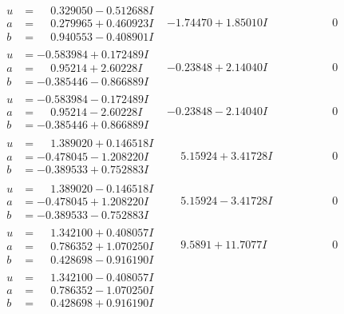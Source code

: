 \documentclass[1p]{elsarticle_modified}
\theoremstyle{definition}
\begin{document}
$$\begin{array}{c|c|c}
\begin{aligned}
u &= \phantom{-}0.329050 - 0.512688 I \\
a &= \phantom{-}0.279965 + 0.460923 I \\
b &= \phantom{-}0.940553 - 0.408901 I\end{aligned}
 & -1.74470 + 1.85010 I & \phantom{-0.000000 } 0 \\ \hline\begin{aligned}
u &= -0.583984 + 0.172489 I \\
a &= \phantom{-}0.95214 + 2.60228 I \\
b &= -0.385446 - 0.866889 I\end{aligned}
 & -0.23848 + 2.14040 I & \phantom{-0.000000 } 0 \\ \hline\begin{aligned}
u &= -0.583984 - 0.172489 I \\
a &= \phantom{-}0.95214 - 2.60228 I \\
b &= -0.385446 + 0.866889 I\end{aligned}
 & -0.23848 - 2.14040 I & \phantom{-0.000000 } 0 \\ \hline\begin{aligned}
u &= \phantom{-}1.389020 + 0.146518 I \\
a &= -0.478045 - 1.208220 I \\
b &= -0.389533 + 0.752883 I\end{aligned}
 & \phantom{-}5.15924 + 3.41728 I & \phantom{-0.000000 } 0 \\ \hline\begin{aligned}
u &= \phantom{-}1.389020 - 0.146518 I \\
a &= -0.478045 + 1.208220 I \\
b &= -0.389533 - 0.752883 I\end{aligned}
 & \phantom{-}5.15924 - 3.41728 I & \phantom{-0.000000 } 0 \\ \hline\begin{aligned}
u &= \phantom{-}1.342100 + 0.408057 I \\
a &= \phantom{-}0.786352 + 1.070250 I \\
b &= \phantom{-}0.428698 - 0.916190 I\end{aligned}
 & \phantom{-}9.5891 + 11.7077 I & \phantom{-0.000000 } 0 \\ \hline\begin{aligned}
u &= \phantom{-}1.342100 - 0.408057 I \\
a &= \phantom{-}0.786352 - 1.070250 I \\
b &= \phantom{-}0.428698 + 0.916190 I\end{aligned}

\end{array}$$
\end{document}
